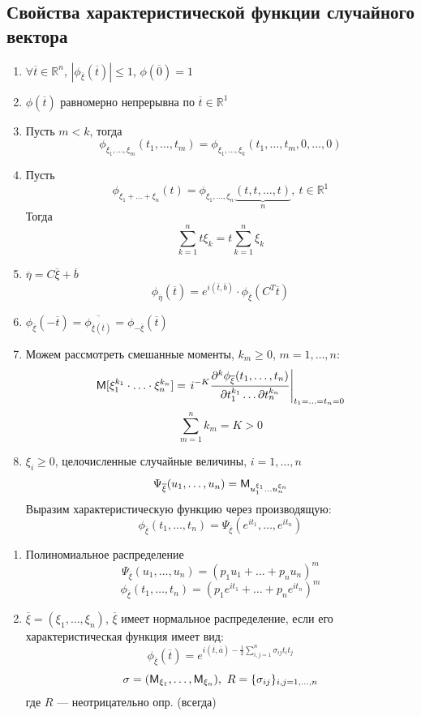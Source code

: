 \subsection{Свойства характеристической функции случайного вектора}
\begin{enumerate}
	\item $\forall \overline{t} \in \mathbb{R}^n$, $|\phi_{\overline{\xi}} (\overline{t}) | \leqslant 1$, $\phi (\overline{0}) = 1$
	\item $\phi(\overline{t})$ равномерно непрерывна по $\overline{t} \in \mathbb{R}^1$
	\item Пусть $m < k$, тогда
\[
	\phi_{\xi_1, \ldots, \xi_m} (t_1, \ldots, t_m) = \phi_{\xi_1, \ldots, \xi_k} (t_1, \ldots, t_m, 0, \ldots, 0)
\]
	\item Пусть 
	\[
		\phi_{\xi_1 + \ldots + \xi_n} (t) = \phi_{\xi_1, \ldots, \xi_n} \underbrace{(t, t, \ldots, t)}_{n}, \ t \in \mathbb{R}^1
	\]
	Тогда
	\[
		\sum\limits_{k = 1}^{n} t \xi_k = t \sum\limits_{k = 1}^{n} \xi_k
	\]
	\item $\overline{\eta} = C \overline{\xi} + \overline{b}$
	\[
		\phi_{\overline{\eta}} (\overline{t}) = e^{i(\overline{t}, \overline{b})} \cdot \phi_{\overline{\xi}} (C^T \overline{t})
	\]
	\item $\phi_{\overline{\xi}} (- \overline{t}) = \overline{\phi_{\overline{\xi} (\overline{t})}} = \phi_{- \overline{\xi}} (\overline{t})$
	\item Можем рассмотреть смешанные моменты, $k_m \geqslant 0$, $m = 1, \ldots, n$:
	\[
		\mathsf{M} [\xi_1^{k_1} \cdot \ldots \cdot \xi_n^{k_n}] = \left. i^{-K} \frac{\partial^k \phi_{\overline{\xi}} (t_1, \ldots, t_n)}{\partial t_1^{k_1} \ldots \partial t_n^{k_n}} \right|_{t_1 = \ldots = t_n = 0}
	\]
	\[
		\sum\limits_{m = 1}^{n} k_m = K > 0
	\]
	\item $\xi_i \geqslant 0$, целочисленные случайные величины, $i = 1, \ldots, n$
	\[
		\Psi_{\overline{\xi}} (u_1, \ldots, u_n) = \mathsf{M}_{u_1^{\xi_1} \ldots u_n^{\xi_n}}
	\]
	Выразим характеристическую функцию через производящую:
	\[
		\phi_{\overline{\xi}} (t_1, \ldots, t_n) = \Psi_{\overline{\xi}} (e^{it_1}, \ldots, e^{it_n})
	\]
\end{enumerate}
\begin{example}
	\begin{enumerate}
		\item Полиномиальное распределение 
		\[
			\Psi_{\overline{\xi}} (u_1, \ldots, u_n) = (p_1 u_1 + \ldots + p_n u_n)^m
		\]
		\[
			\phi_{\overline{\xi}} (t_1, \ldots, t_n) = (p_1 e^{it_1} + \ldots + p_n e^{it_n})^m
		\]
		\item $\overline{\xi} = (\xi_1, \ldots, \xi_n)$, $\overline{\xi}$ имеет нормальное распределение, если его характеристическая функция имеет вид:
	\[
		\phi_{\overline{\xi}} (\overline{t}) = e^{i(\overline{t}, \overline{a}) - \frac{1}{2} \sum\limits_{i, j = 1}^{n} \sigma_{ij} t_i t_j}
	\]
	\[
		\sigma = (\mathsf{M}_{\xi_1}, \ldots, \mathsf{M}_{\xi_n} ), \ R = \{ \sigma_{ij} \}_{i, j = 1, \ldots, n}
	\]
	где $R$ --- неотрицательно опр. (всегда)
	\end{enumerate}
\end{example}

